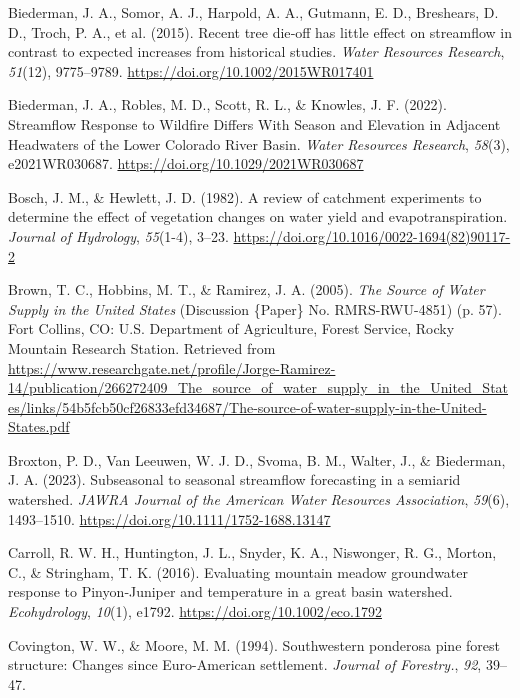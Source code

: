\documentclass[
]{agujournal2019}
\newlength{\cslhangindent}
\newenvironment{CSLReferences}[2] %
 {\begin{list}{}{%
  \setlength{\itemindent}{0pt}
  \setlength{\leftmargin}{0pt}
  \setlength{\parsep}{0pt}
  \ifodd #1
   \setlength{\leftmargin}{\cslhangindent}
   \setlength{\itemindent}{-1\cslhangindent}
  \fi
  \setlength{\itemsep}{#2\baselineskip}}}
 {\end{list}}
\begin{document}
\begin{CSLReferences}{1}{0}
Biederman, J. A., Somor, A. J., Harpold, A. A., Gutmann, E. D.,
Breshears, D. D., Troch, P. A., et al. (2015). Recent tree die‐off has
little effect on streamflow in contrast to expected increases from
historical studies. \emph{Water Resources Research}, \emph{51}(12),
9775--9789. \url{https://doi.org/10.1002/2015WR017401}

Biederman, J. A., Robles, M. D., Scott, R. L., \& Knowles, J. F. (2022).
Streamflow {Response} to {Wildfire} {Differs} {With} {Season} and
{Elevation} in {Adjacent} {Headwaters} of the {Lower} {Colorado} {River}
{Basin}. \emph{Water Resources Research}, \emph{58}(3), e2021WR030687.
\url{https://doi.org/10.1029/2021WR030687}

Bosch, J. M., \& Hewlett, J. D. (1982). A review of catchment
experiments to determine the effect of vegetation changes on water yield
and evapotranspiration. \emph{Journal of Hydrology}, \emph{55}(1-4),
3--23. \url{https://doi.org/10.1016/0022-1694(82)90117-2}

Brown, T. C., Hobbins, M. T., \& Ramirez, J. A. (2005). \emph{The
{Source} of {Water} {Supply} in the {United} {States}} (Discussion
\{Paper\} No. RMRS-RWU-4851) (p. 57). Fort Collins, CO: U.S. Department
of Agriculture, Forest Service, Rocky Mountain Research Station.
Retrieved from
\url{https://www.researchgate.net/profile/Jorge-Ramirez-14/publication/266272409_The_source_of_water_supply_in_the_United_States/links/54b5fcb50cf26833efd34687/The-source-of-water-supply-in-the-United-States.pdf}

Broxton, P. D., Van Leeuwen, W. J. D., Svoma, B. M., Walter, J., \&
Biederman, J. A. (2023). Subseasonal to seasonal streamflow forecasting
in a semiarid watershed. \emph{JAWRA Journal of the American Water
Resources Association}, \emph{59}(6), 1493--1510.
\url{https://doi.org/10.1111/1752-1688.13147}

Carroll, R. W. H., Huntington, J. L., Snyder, K. A., Niswonger, R. G.,
Morton, C., \& Stringham, T. K. (2016). Evaluating mountain meadow
groundwater response to {Pinyon}‐{Juniper} and temperature in a great
basin watershed. \emph{Ecohydrology}, \emph{10}(1), e1792.
\url{https://doi.org/10.1002/eco.1792}

Covington, W. W., \& Moore, M. M. (1994). Southwestern ponderosa pine
forest structure: Changes since {Euro}-{American} settlement.
\emph{Journal of Forestry.}, \emph{92}, 39--47.


\end{CSLReferences}
\end{document}
